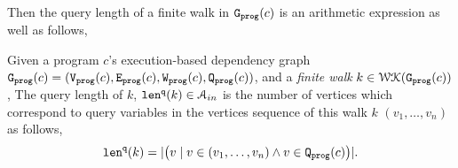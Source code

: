  Then the query length of a finite walk in  $\mathtt{{G_{prog}}}(c)$ is an arithmetic expression as well as follows,
\begin{defn}
  \label{def:qlen}
  Given 
  a program $c$'s execution-based dependency graph 
  $\mathtt{{G_{prog}}}({c}) = (\mathtt{{V_{prog}}}(c), \mathtt{{E_{prog}}}(c), \mathtt{{W_{prog}}}(c), \mathtt{{Q_{prog}}}(c))$, 
   and a \emph{finite walk} $k \in \mathcal{WK}(\mathtt{{G_{prog}}}(c))$,
  The query length of $k$, $\mathtt{len}^{\tt q}(k) \in \mathcal{A}_{in}$ 
  is the number of vertices which correspond to query variables in the vertices sequence of this walk $k$
  $(v_1, \ldots, v_{n})$ as follows, 
  \[
    \mathtt{len}^{\tt q}(k) = |\big( v \mid v \in (v_1, \ldots, v_{n}) \land v \in \mathtt{{Q_{prog}}}(c) \big)|.
  \]
  \end{defn}
%
